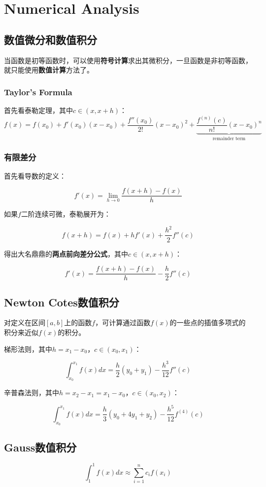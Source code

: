 \chapter{Numerical Analysis}

\section{数值微分和数值积分}
当函数是初等函数时，可以使用\textbf{符号计算}求出其微积分，一旦函数是非初等函数，就只能使用\textbf{数值计算}方法了。

\subsection{Taylor's Formula}
首先看泰勒定理，其中$ c\in(x,x+h) $：
\begin{equation}
f(x) =f(x_0)+f'(x_0)(x-x_0) + \frac{f''(x_0)}{2!}(x-x_0)^2 +
\underbrace{\frac{f^{(n)}(c)}{n!}(x-x_0)^n}_{\text{remainder term}}
\end{equation}

\subsection{有限差分}
首先看导数的定义：

\begin{equation}
f'(x) = \lim_{h\rightarrow 0} \frac{f(x+h)-f(x)}{h}
\end{equation}

如果$ f $二阶连续可微，泰勒展开为：

\begin{equation}
f(x+h) = f(x)+hf'(x)+\frac{h^2}{2}f''(c)
\end{equation}

得出大名鼎鼎的\textbf{两点前向差分公式}，其中$ c\in(x,x+h) $：

\begin{equation}
f'(x) = \frac{f(x+h)-f(x)}{h} - \frac{h}{2}f''(c)
\end{equation}

\section{Newton Cotes数值积分}
对定义在区间$ [a,b] $上的函数$ f $，可计算通过函数$ f(x) $的一些点的插值多项式的积分来近似$ f(x) $的积分。

梯形法则，其中$ h=x_1-x_0 $，$ c\in(x_0,x_1) $：

\begin{equation}
\int_{x_0}^{x_1}f(x)dx = \frac{h}{2}(y_0 + y_1) - \frac{h^3}{12}f''(c)
\end{equation}

辛普森法则，其中$ h=x_2-x_1=x_1-x_0 $，$ c\in(x_0,x_2) $：

\begin{equation}
\int_{x_0}^{x_1}f(x)dx = \frac{h}{3}(y_0 +4 y_1+y_2) - \frac{h^5}{12}f^{(4)}(c)
\end{equation}

\section{Gauss数值积分}

\begin{equation}
\int_1^1f(x)dx \approx \sum_{i=1}^n c_i f(x_i)
\end{equation}